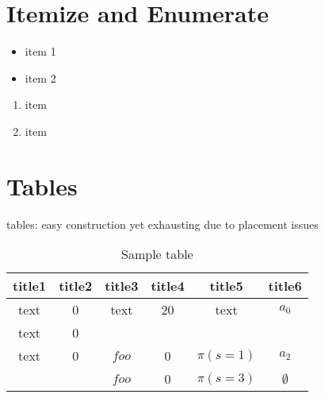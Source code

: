 \documentclass[12pt]{article}                       %
\begin{document}
\vspace{20px}
\section*{Itemize and Enumerate}
\begin{itemize}
    \item item 1
    \item item 2 
\end{itemize}

\begin{enumerate}
	\item item
	\item item 
\end{enumerate}



\vspace{20px}
\section*{Tables}
tables: easy construction yet exhausting due to placement issues 

\begin{table}%
\small
\centering
\caption{Sample table}
\label{table:example}
\begin{tabular}{|c|c|c|c|c|c|}	%
\hline 							%
\textbf{title1} & \textbf{title2} & \textbf{title3} & \textbf{title4} & \textbf{title5} & \textbf{title6} \\
\hline 
\hline 
text & 0 & text & 20 & text & $a_0$\\			%
text & 0 & & & & \\
text & 0 & $foo$ & 0 & $\pi(s = 1)$ & $a_2$\\
 &  & $foo$ & 0 & $\pi(s = 3)$ & $\emptyset$\\
\hline 

\end{tabular}
\end{table}
\end{document}
